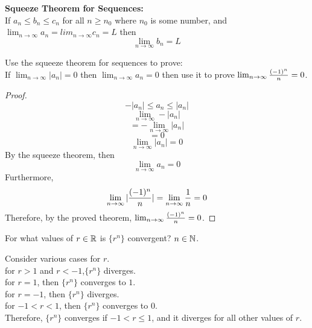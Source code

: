 \documentclass[english, 12pt]{article}
\begin{document}
\begin{thrm}
\textbf{Squeeze Theorem for Sequences:}\\
If $a_{n} \leq b_{n} \leq c_{n}$ for all $n \geq n_{0}$ where $n_{0}$ is some number, and $\lim_{n\to\infty} a_{n} = lim_{n\to\infty} c_{n} = L$ then
\[\lim_{n\to\infty} b_{n} = L \]
\end{thrm}
\begin{exmp}
Use the squeeze theorem for sequences to prove:\\
If $\lim_{n\to\infty} |a_{n}| = 0$ then $\lim_{n\to\infty} a_{n} =0$ then use it to prove $\lim_{n\to\infty} \frac{(-1)^n}{n} = 0$.
\begin{sol}
\begin{proof}
\[- |a_{n}| \leq a_{n} \leq |a_{n}| \]
\[ \lim_{n\to\infty} - |a_{n}| \]
\[ = - \lim_{n\to\infty} |a_{n}| \]
\[ = 0 \]
\[ \lim_{n\to\infty} |a_{n}| =0 \]
By the squeeze theorem, then 
\[ \lim_{n\to\infty} a_{n} =0 \]
Furthermore,
\[\lim_{n\to\infty} |\frac{(-1)^n}{n}| = \lim_{n\to\infty} \frac{1}{n} = 0 \]
Therefore, by the proved theorem,  $\lim_{n\to\infty} \frac{(-1)^n}{n} = 0$.
\end{proof}
\end{sol}
\end{exmp}
\begin{exmp}
For what values of $r\in {\mathbb{R}}$ is $\{r^n\}$ convergent? $n \in {\mathbb{N}}$.
\begin{sol}
Consider various cases for $r$.\\
for $r>1$ and $r < -1$,$ \{r^n\}$ diverges.\\
for $r=1$, then $\{r^n\}$ converges to $1$.\\
for $r=-1$, then $\{r^n\}$ diverges.\\
for $-1 < r < 1$, then $\{r^n\}$ converges to $0$.\\
Therefore, $\{r^n\}$ converges if $-1 < r \leq 1$, and it diverges for all other values of $r$.
\end{sol}
\end{exmp}
\end{document}

